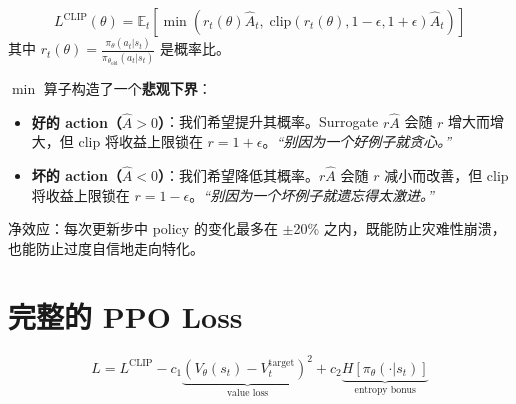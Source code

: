 \begin{equation}
\boxed{L^{\text{CLIP}}(\theta) = \mathbb{E}_t\left[\min\left(r_t(\theta)\hat{A}_t,\; \text{clip}(r_t(\theta), 1{-}\epsilon, 1{+}\epsilon)\hat{A}_t\right)\right]}
\end{equation}
其中 $r_t(\theta) = \frac{\pi_\theta(a_t|s_t)}{\pi_{\theta_\text{old}}(a_t|s_t)}$ 是概率比。

\begin{intuitionbox}
$\min$ 算子构造了一个\textbf{悲观下界}：

\begin{itemize}
  \item \textbf{好的 action（$\hat{A} > 0$）}：我们希望提升其概率。Surrogate $r\hat{A}$ 会随 $r$ 增大而增大，但 clip 将收益上限锁在 $r = 1 + \epsilon$。\emph{“别因为一个好例子就贪心。”}
  \item \textbf{坏的 action（$\hat{A} < 0$）}：我们希望降低其概率。$r\hat{A}$ 会随 $r$ 减小而改善，但 clip 将收益上限锁在 $r = 1 - \epsilon$。\emph{“别因为一个坏例子就遗忘得太激进。”}
\end{itemize}

净效应：每次更新步中 policy 的变化最多在 $\pm$20\% 之内，既能防止灾难性崩溃，也能防止过度自信地走向特化。
\end{intuitionbox}

\section{完整的 PPO Loss}
\label{full-ppo-loss}

\begin{equation}
L = L^{\text{CLIP}} - c_1 \underbrace{(V_\theta(s_t) - V^{\text{target}}_t)^2}_{\text{value loss}} + c_2 \underbrace{H[\pi_\theta(\cdot|s_t)]}_{\text{entropy bonus}}
\end{equation}

